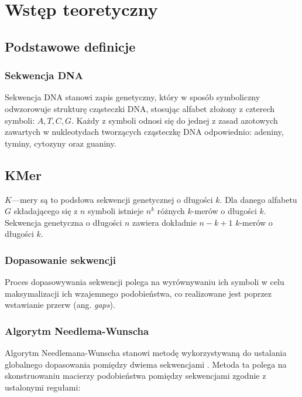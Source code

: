




\clearpage
\section{Wstęp teoretyczny}

    \subsection{Podstawowe definicje}

        \subsubsection{Sekwencja DNA}

            Sekwencja DNA stanowi zapis genetyczny, który w sposób symboliczny odwzorowuje strukturę cząsteczki DNA, stosując alfabet złożony z czterech symboli: $A, T, C, G$. Każdy z symboli odnosi się do jednej z zasad azotowych zawartych w nukleotydach tworzących cząsteczkę DNA odpowiednio: adeniny, tyminy, cytozyny oraz guaniny.

            \subsection{KMer}
        
            $K$—mery są to podsłowa sekwencji genetycznej o długości $k$. Dla danego alfabetu $G$ składającego się z $n$ symboli istnieje $n^k$ różnych $k$-merów o długości $k$. Sekwencja genetyczna o długości $n$ zawiera dokładnie $n - k + 1$ $k$-merów o długości $k$.

        \subsubsection{Dopasowanie sekwencji}
        
            Proces dopasowywania sekwencji polega na wyrównywaniu ich symboli w celu maksymalizacji ich wzajemnego podobieństwa, co realizowane jest poprzez wstawianie przerw (ang. \textit{gaps}).
            
        \subsubsection{Algorytm Needlema-Wunscha}
        
           Algorytm Needlemana-Wunscha stanowi metodę wykorzystywaną do ustalania globalnego dopasowania pomiędzy dwiema sekwencjami \cite{NeedlemanWunsch1970}. Metoda ta polega na skonstruowaniu macierzy podobieństwa pomiędzy sekwencjami zgodnie z ustalonymi regułami:


